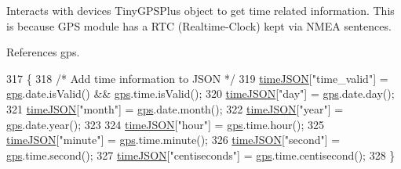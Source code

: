 Interacts with devices Tiny\+G\+P\+S\+Plus object to get time related information. This is because G\+PS module has a R\+TC (Realtime-\/\+Clock) kept via N\+M\+EA sentences. 

References gps.


\begin{DoxyCode}
317 \{
318   \textcolor{comment}{/* Add time information to JSON */}
319   \hyperlink{logging-device_8ino_acc172a29cb5ff709b48b650d9fb6503c}{timeJSON}[\textcolor{stringliteral}{"time\_valid"}] = \hyperlink{logging-device_8ino_a169c53997a7da1d0fb99aec1b4675ce8}{gps}.date.isValid() && \hyperlink{logging-device_8ino_a169c53997a7da1d0fb99aec1b4675ce8}{gps}.time.isValid();
320   \hyperlink{logging-device_8ino_acc172a29cb5ff709b48b650d9fb6503c}{timeJSON}[\textcolor{stringliteral}{"day"}] = \hyperlink{logging-device_8ino_a169c53997a7da1d0fb99aec1b4675ce8}{gps}.date.day();
321   \hyperlink{logging-device_8ino_acc172a29cb5ff709b48b650d9fb6503c}{timeJSON}[\textcolor{stringliteral}{"month"}] = \hyperlink{logging-device_8ino_a169c53997a7da1d0fb99aec1b4675ce8}{gps}.date.month();
322   \hyperlink{logging-device_8ino_acc172a29cb5ff709b48b650d9fb6503c}{timeJSON}[\textcolor{stringliteral}{"year"}] = \hyperlink{logging-device_8ino_a169c53997a7da1d0fb99aec1b4675ce8}{gps}.date.year();
323 
324   \hyperlink{logging-device_8ino_acc172a29cb5ff709b48b650d9fb6503c}{timeJSON}[\textcolor{stringliteral}{"hour"}] = \hyperlink{logging-device_8ino_a169c53997a7da1d0fb99aec1b4675ce8}{gps}.time.hour();
325   \hyperlink{logging-device_8ino_acc172a29cb5ff709b48b650d9fb6503c}{timeJSON}[\textcolor{stringliteral}{"minute"}] = \hyperlink{logging-device_8ino_a169c53997a7da1d0fb99aec1b4675ce8}{gps}.time.minute();
326   \hyperlink{logging-device_8ino_acc172a29cb5ff709b48b650d9fb6503c}{timeJSON}[\textcolor{stringliteral}{"second"}] = \hyperlink{logging-device_8ino_a169c53997a7da1d0fb99aec1b4675ce8}{gps}.time.second();
327   \hyperlink{logging-device_8ino_acc172a29cb5ff709b48b650d9fb6503c}{timeJSON}[\textcolor{stringliteral}{"centiseconds"}] = \hyperlink{logging-device_8ino_a169c53997a7da1d0fb99aec1b4675ce8}{gps}.time.centisecond();
328 \}
\end{DoxyCode}
